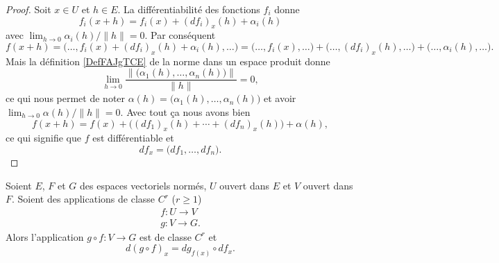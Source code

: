 \begin{proof}
    Soit \( x\in U\) et \( h\in E\). La différentiabilité des fonctions \( f_i\) donne
    \begin{equation}
        f_i(x+h)=f_i(x)+(df_i)_x(h)+\alpha_i(h)
    \end{equation}
    avec \( \lim_{h\to 0} \alpha_i(h)/\| h \|=0\). Par conséquent
    \begin{equation}
        f(x+h)=\big( \ldots, f_i(x)+(df_i)_x(h)+\alpha_i(h),\ldots \big)= \big( \ldots,f_i(x),\ldots \big)+ \big( \ldots,(df_i)_x(h),\ldots \big)+ \big( \ldots,\alpha_i(h),\ldots \big).
    \end{equation}
    Mais la définition \ref{DefFAJgTCE} de la norme dans un espace produit donne
    \begin{equation}
        \lim_{h\to 0} \frac{ \| \big( \alpha_1(h),\ldots, \alpha_n(h) \big) \| }{ \| h \| }=0,
    \end{equation}
    ce qui nous permet de noter \( \alpha(h)=\big( \alpha_1(h),\ldots, \alpha_n(h) \big)\) et avoir \( \lim_{h\to 0} \alpha(h)/\| h \|=0\). Avec tout ça nous avons bien
    \begin{equation}
        f(x+h)=f(x)+\big( (df_1)_x(h)+\cdots +(df_n)_x(h) \big)+\alpha(h),
    \end{equation}
    ce qui signifie que \( f\) est différentiable et
    \begin{equation}
        df_x=\big( df_1,\ldots, df_n \big).
    \end{equation}
\end{proof}

\begin{theorem}    \label{ThoAGXGuEt}
    Soient \( E\), \( F\) et \( G\) des espaces vectoriels normés, \( U\) ouvert dans \( E\) et \( V\) ouvert dans \( F\). Soient des applications de classe \( C^r\) (\( r\geq 1\))
    \begin{subequations}
        \begin{align}
            f\colon U\to V\\
            g\colon V\to G.
        \end{align}
    \end{subequations}
    Alors l'application \( g\circ f\colon V\to G\) est de classe \( C^r\) et
    \begin{equation}\label{EqHFmezmr}
        d(g\circ f)_x=dg_{f(x)}\circ df_x.
    \end{equation}
\end{theorem}

